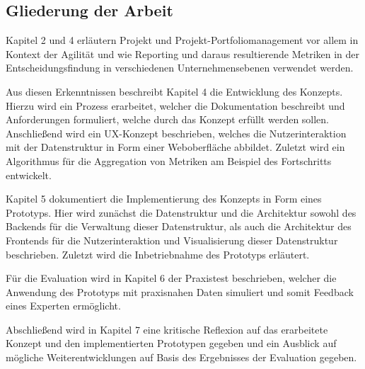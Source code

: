 \subsection{Gliederung der Arbeit}
Kapitel 2 und 4 erläutern Projekt und Projekt-Portfoliomanagement vor allem in Kontext der Agilität und wie Reporting und daraus resultierende Metriken in der Entscheidungsfindung in verschiedenen Unternehmensebenen verwendet werden.

Aus diesen Erkenntnissen beschreibt Kapitel 4 die Entwicklung des Konzepts. Hierzu wird ein Prozess erarbeitet, welcher die Dokumentation beschreibt und Anforderungen formuliert, welche durch das Konzept erfüllt werden sollen. Anschließend wird ein UX-Konzept beschrieben, welches die Nutzerinteraktion mit der Datenstruktur in Form einer Weboberfläche abbildet. Zuletzt wird ein Algorithmus für die Aggregation von Metriken am Beispiel des Fortschritts entwickelt.

Kapitel 5 dokumentiert die Implementierung des Konzepts in Form eines Prototyps. Hier wird zunächst die Datenstruktur und die Architektur sowohl des Backends für die Verwaltung dieser Datenstruktur, als auch die Architektur des Frontends für die Nutzerinteraktion und Visualisierung dieser Datenstruktur beschrieben.
Zuletzt wird die Inbetriebnahme des Prototyps erläutert.

Für die Evaluation wird in Kapitel 6 der Praxistest beschrieben, welcher die Anwendung des Prototyps mit praxisnahen Daten simuliert und somit Feedback eines Experten ermöglicht.

Abschließend wird in Kapitel 7 eine kritische Reflexion auf das erarbeitete Konzept und den implementierten Prototypen gegeben und ein Ausblick auf mögliche Weiterentwicklungen auf Basis des Ergebnisses der Evaluation gegeben.
